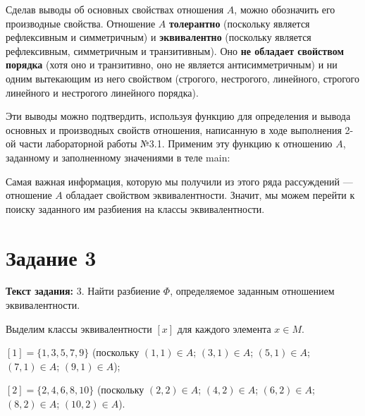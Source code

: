 \documentclass[12pt]{article}
\begin{document}
	Сделав выводы об основных свойствах отношения $A$, можно обозначить его производные свойства. Отношение $A$ {\bf толерантно} (поскольку является рефлексивным и симметричным) и {\bf эквивалентно} (поскольку является рефлексивным, симметричным и транзитивным). Оно {\bf не обладает свойством порядка} (хотя оно и транзитивно, оно не является антисимметричным) и ни одним вытекающим из него свойством (строгого, нестрогого, линейного, строгого линейного и нестрогого линейного порядка).
	
	Эти выводы можно подтвердить, используя функцию для определения и вывода основных и производных свойств отношения, написанную в ходе выполнения 2-ой части лабораторной работы №3.1. Применим эту функцию к отношению $A$, заданному и заполненному значениями в теле main:
	
	 
	
	\begin{figure}[h]
		\noindent{}
	\end{figure}
	
	Самая важная информация, которую мы получили из этого ряда рассуждений --- отношение $A$ обладает свойством эквивалентности. Значит, мы можем перейти к поиску заданного им разбиения на классы эквивалентности.

	\section{Задание 3}
	\label{task3}

	{\bf Текст задания:} 3. Найти разбиение $\Phi$, определяемое заданным отношением эквивалентности.
	
	Выделим классы эквивалентности $[x]$ для каждого элемента $x \in M$.
	
	$[1] = \{1, 3, 5, 7, 9\}$ (поскольку $(1, 1) \in A$; $(3, 1) \in A$; $(5, 1) \in A$; $(7, 1) \in A$; $(9, 1) \in A$);
	
	$[2] = \{2, 4, 6, 8, 10\}$ (поскольку $(2, 2) \in A$; $(4, 2) \in A$; $(6, 2) \in A$; $(8, 2) \in A$; $(10, 2) \in A$).
	
\end{document}
